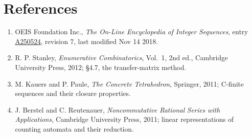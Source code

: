 \documentclass[11pt]{article}
\theoremstyle{definition}
\begin{document}
\section{References}

\begin{enumerate}

\item OEIS Foundation Inc., \emph{The On-Line Encyclopedia of Integer Sequences}, entry \href{https://oeis.org/A250524}{A250524}, revision 7, last modified Nov 14 2018.

\item R. P. Stanley, \emph{Enumerative Combinatorics}, Vol.~1, 2nd ed., Cambridge University Press, 2012; \S4.7, the transfer-matrix method.

\item M. Kauers and P. Paule, \emph{The Concrete Tetrahedron}, Springer, 2011; C-finite sequences and their closure properties.

\item J. Berstel and C. Reutenauer, \emph{Noncommutative Rational Series with Applications}, Cambridge University Press, 2011; linear representations of counting automata and their reduction.

\end{enumerate}
\end{document}
